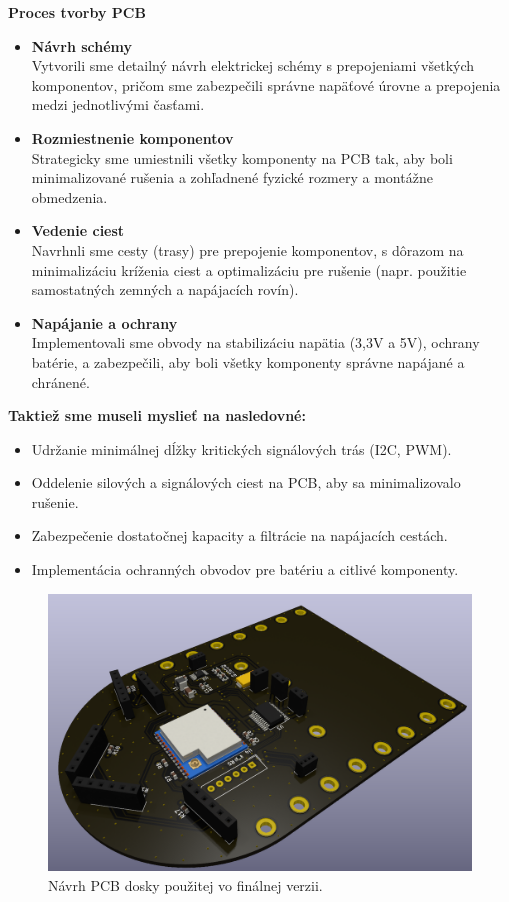 \textbf{Proces tvorby PCB}
\begin{itemize}

\item \textbf{Návrh schémy}\\
Vytvorili sme detailný návrh elektrickej schémy s prepojeniami všetkých komponentov, pričom sme zabezpečili správne napäťové úrovne a prepojenia medzi jednotlivými časťami.

\item \textbf{Rozmiestnenie komponentov}\\
Strategicky sme umiestnili všetky komponenty na PCB tak, aby boli minimalizované rušenia a zohľadnené fyzické rozmery a montážne obmedzenia.

\item \textbf{Vedenie ciest}\\
Navrhnli sme cesty (trasy) pre prepojenie komponentov, s dôrazom na minimalizáciu kríženia ciest a optimalizáciu pre rušenie (napr. použitie samostatných zemných a napájacích rovín).

\item \textbf{Napájanie a ochrany}\\
Implementovali sme obvody na stabilizáciu napätia (3,3V a 5V), ochrany batérie, a zabezpečili, aby boli všetky komponenty správne napájané a chránené.
 
\end{itemize}

\textbf{Taktiež sme museli myslieť na nasledovné:}
\begin{itemize}
    \item Udržanie minimálnej dĺžky kritických signálových trás (I2C, PWM).
    \item Oddelenie silových a signálových ciest na PCB, aby sa minimalizovalo rušenie.
    \item Zabezpečenie dostatočnej kapacity a filtrácie na napájacích cestách.
    \item Implementácia ochranných obvodov pre batériu a citlivé komponenty.
\end{itemize}

\begin{figure}[!htpb]
    \centering
    \includegraphics[width=1\linewidth]{includes//images/PCB.png}
    \caption{Návrh PCB dosky použitej vo finálnej verzii.}
    \label{fig:PCB}
\end{figure}

